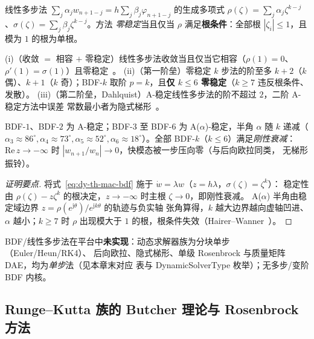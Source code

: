 \begin{definition}[生成多项式与零稳定]\label{def:dy-th-mac-rootcond}
线性多步法 $\sum_j\alpha_j w_{n+1-j}=h\sum_j\beta_j\varphi_{n+1-j}$ 的生成多项式
$\rho(\zeta)=\sum_j\alpha_j\zeta^{k-j}$、$\sigma(\zeta)=\sum_j\beta_j\zeta^{k-j}$。方法
\emph{零稳定}当且仅当 $\rho$ 满足\textbf{根条件}：全部根 $|\zeta_i|\le1$，且模为 $1$ 的根为单根。
\end{definition}

\begin{theorem}\label{thm:dy-th-mac-dahlquist}
(i)（收敛 $=$ 相容 $+$ 零稳定）线性多步法收敛当且仅当它相容（$\rho(1)=0$、
$\rho'(1)=\sigma(1)$）且零稳定~\cite{dym:hairer1}。
(ii)（第一阶垒）零稳定 $k$ 步法的阶至多 $k+2$（$k$ 偶）、$k+1$（$k$ 奇）；BDF-$k$
取阶 $p=k$，且\textbf{仅 $k\le6$ 零稳定}（$k\ge7$ 违反根条件、发散）。
(iii)（第二阶垒，Dahlquist）A-稳定线性多步法的阶不超过 $2$，二阶 A-稳定方法中误差
常数最小者为隐式梯形~\cite{dym:hairer2}。
\end{theorem}

\begin{proposition}\label{prop:dy-th-mac-bdfstab}
BDF-$1$、BDF-$2$ 为 A-稳定；BDF-$3$ 至 BDF-$6$ 为 A($\alpha$)-稳定，半角 $\alpha$ 随 $k$
递减（$\alpha_3\!\approx\!86^\circ,\alpha_4\!\approx\!73^\circ,\alpha_5\!\approx\!52^\circ,
\alpha_6\!\approx\!18^\circ$）。全部 BDF-$k$（$k\le6$）满足\emph{刚性衰减}：
$\mathrm{Re}\,z\to-\infty$ 时 $|w_{n+1}/w_n|\to0$，快模态被一步压向零（与后向欧拉同类，
无梯形振铃）。
\end{proposition}
\begin{proof}[证明要点]
将式~\eqref{eq:dy-th-mac-bdf} 施于 $\dot w=\lambda w$（$z=h\lambda$，$\sigma(\zeta)=\zeta^k$）：
稳定性由 $\rho(\zeta)-z\zeta^k$ 的根决定，$z\to-\infty$ 时主根 $\zeta\to0$，即刚性衰减。
A($\alpha$) 半角由稳定域边界 $z=\rho(e^{\mathrm j\theta})/e^{\mathrm jk\theta}$ 的轨迹与负实轴
张角算得，$k$ 越大边界越向虚轴凹进、$\alpha$ 越小；$k\ge7$ 时 $\rho$ 出现模大于 $1$
的根，根条件失效（Hairer--Wanner~\cite{dym:hairer2}）。
\end{proof}

\begin{gapnote}
BDF/线性多步法在平台中\textbf{未实现}：动态求解器族为分块单步（Euler/Heun/RK4）、
后向欧拉、隐式梯形、单级 Rosenbrock 与质量矩阵 DAE，均为\emph{单步}法（见本章末对应
表与 DynamicSolverType 枚举）；无多步/变阶 BDF 内核。
\end{gapnote}

\subsection{Runge--Kutta 族的 Butcher 理论与 Rosenbrock 方法}\label{sec:dy-th-mac-rk}

